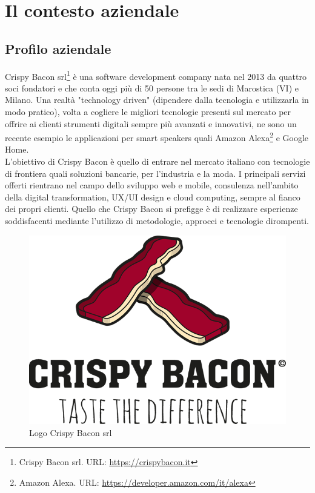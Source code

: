 
\chapter{Il contesto aziendale}
\label{cap:contesto_aziendale}
\section{Profilo aziendale}
Crispy Bacon srl\footnote{Crispy Bacon srl. URL: \href{https://crispybacon.it/}{https://crispybacon.it}} è una software development company nata nel 2013 da quattro soci fondatori e che conta oggi più di 50 persone tra le sedi di Marostica (VI) e Milano. Una realtà "technology driven" (dipendere dalla tecnologia e utilizzarla in modo pratico), volta a cogliere le migliori tecnologie presenti sul mercato per offrire ai clienti strumenti digitali sempre più avanzati e innovativi, ne sono un recente esempio le applicazioni per smart speakers quali Amazon Alexa\footnote{Amazon Alexa. URL: \href{https://developer.amazon.com/it/alexa}{https://developer.amazon.com/it/alexa}} e Google Home.\\
L’obiettivo di Crispy Bacon è quello di entrare nel mercato italiano con tecnologie di frontiera quali soluzioni bancarie, per l'industria e la moda.
I principali servizi offerti rientrano nel campo dello sviluppo web e mobile, consulenza nell'ambito della digital transformation, UX/UI design e cloud computing, sempre al fianco dei propri clienti.
Quello che Crispy Bacon si prefigge è di realizzare esperienze soddisfacenti mediante l’utilizzo di metodologie, approcci e tecnologie dirompenti.
\begin{figure}[H] 
    \centering 
    \includegraphics[width=0.7\columnwidth]{immagini/logo.png}
    \caption{\label{fig:logo_cripsy}Logo Crispy Bacon srl}
\end{figure}
